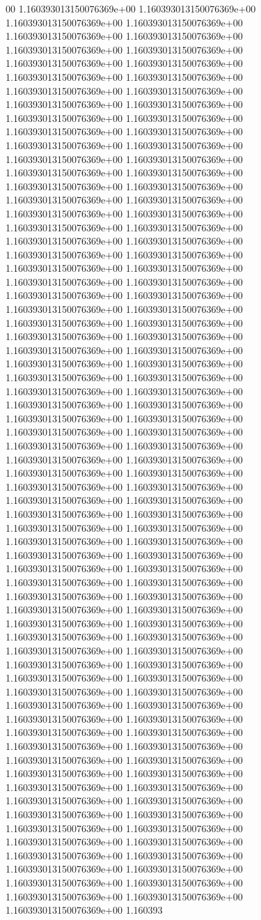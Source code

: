 00	1.160393013150076369e+00	1.160393013150076369e+00	1.160393013150076369e+00	1.160393013150076369e+00	1.160393013150076369e+00	1.160393013150076369e+00	1.160393013150076369e+00	1.160393013150076369e+00	1.160393013150076369e+00	1.160393013150076369e+00	1.160393013150076369e+00	1.160393013150076369e+00	1.160393013150076369e+00	1.160393013150076369e+00	1.160393013150076369e+00	1.160393013150076369e+00	1.160393013150076369e+00	1.160393013150076369e+00	1.160393013150076369e+00	1.160393013150076369e+00	1.160393013150076369e+00	1.160393013150076369e+00	1.160393013150076369e+00	1.160393013150076369e+00	1.160393013150076369e+00	1.160393013150076369e+00	1.160393013150076369e+00	1.160393013150076369e+00	1.160393013150076369e+00	1.160393013150076369e+00	1.160393013150076369e+00	1.160393013150076369e+00	1.160393013150076369e+00	1.160393013150076369e+00	1.160393013150076369e+00	1.160393013150076369e+00	1.160393013150076369e+00	1.160393013150076369e+00	1.160393013150076369e+00	1.160393013150076369e+00	1.160393013150076369e+00	1.160393013150076369e+00	1.160393013150076369e+00	1.160393013150076369e+00	1.160393013150076369e+00	1.160393013150076369e+00	1.160393013150076369e+00	1.160393013150076369e+00	1.160393013150076369e+00	1.160393013150076369e+00	1.160393013150076369e+00	1.160393013150076369e+00	1.160393013150076369e+00	1.160393013150076369e+00	1.160393013150076369e+00	1.160393013150076369e+00	1.160393013150076369e+00	1.160393013150076369e+00	1.160393013150076369e+00	1.160393013150076369e+00	1.160393013150076369e+00	1.160393013150076369e+00	1.160393013150076369e+00	1.160393013150076369e+00	1.160393013150076369e+00	1.160393013150076369e+00	1.160393013150076369e+00	1.160393013150076369e+00	1.160393013150076369e+00	1.160393013150076369e+00	1.160393013150076369e+00	1.160393013150076369e+00	1.160393013150076369e+00	1.160393013150076369e+00	1.160393013150076369e+00	1.160393013150076369e+00	1.160393013150076369e+00	1.160393013150076369e+00	1.160393013150076369e+00	1.160393013150076369e+00	1.160393013150076369e+00	1.160393013150076369e+00	1.160393013150076369e+00	1.160393013150076369e+00	1.160393013150076369e+00	1.160393013150076369e+00	1.160393013150076369e+00	1.160393013150076369e+00	1.160393013150076369e+00	1.160393013150076369e+00	1.160393013150076369e+00	1.160393013150076369e+00	1.160393013150076369e+00	1.160393013150076369e+00	1.160393013150076369e+00	1.160393013150076369e+00	1.160393013150076369e+00	1.160393013150076369e+00	1.160393013150076369e+00	1.160393013150076369e+00	1.160393013150076369e+00	1.160393013150076369e+00	1.160393013150076369e+00	1.160393013150076369e+00	1.160393013150076369e+00	1.160393013150076369e+00	1.160393013150076369e+00	1.160393013150076369e+00	1.160393013150076369e+00	1.160393013150076369e+00	1.160393013150076369e+00	1.160393013150076369e+00	1.160393013150076369e+00	1.160393013150076369e+00	1.160393013150076369e+00	1.160393013150076369e+00	1.160393013150076369e+00	1.160393013150076369e+00	1.160393013150076369e+00	1.160393013150076369e+00	1.160393013150076369e+00	1.160393013150076369e+00	1.160393013150076369e+00	1.160393013150076369e+00	1.160393013150076369e+00	1.160393013150076369e+00	1.160393013150076369e+00	1.160393013150076369e+00	1.160393013150076369e+00	1.160393013150076369e+00	1.160393013150076369e+00	1.160393013150076369e+00	1.160393013150076369e+00	1.160393